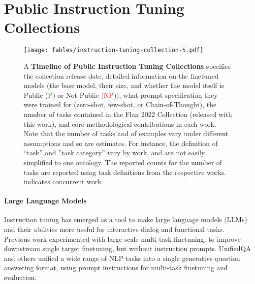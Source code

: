 \section{Public Instruction Tuning Collections}
\label{sec:public-collections}

\begin{figure}[h]
    \centering
    \texttt{[image: fables/instruction-tuning-collection-5.pdf]}
    \caption{
    \small
    A \textbf{Timeline of Public Instruction Tuning Collections} specifies the collection release date, detailed information on the finetuned models (the base model, their size, and whether the model itself is Public (\textcolor{forestgreen}{P}) or Not Public (\textcolor{red}{NP})), what prompt specification they were trained for (zero-shot, few-shot, or Chain-of-Thought), the number of tasks contained in the Flan 2022 Collection (released with this work), and core methodological contributions in each work.\\
    Note that the number of tasks and of examples vary under different assumptions and so are estimates. For instance, the definition of ``task'' and ''task category'' vary by work, and are not easily simplified to one ontology. The reported counts for the number of tasks are reported using task definitions from the respective works.\\
    \textsuperscript{\textdagger} indicates concurrent work.\\
    }
    \vspace{-3mm}
    \label{fig:instruction-tuning-collections}
\end{figure}

\paragraph{Large Language Models} Instruction tuning has emerged as a tool to make large language models (LLMs) and their abilities more useful for interactive dialog and functional tasks.
Previous work \citep{raffel2020exploring, liu2019multi,aghajanyan-etal-2021-muppet, aribandi2021ext5} experimented with large scale multi-task finetuning, to improve downstream single target finetuning, but without instruction prompts.
UnifiedQA and others \citep{khashabi-etal-2020-unifiedqa, mccann2018natural, keskar2019unifying} unified a wide range of NLP tasks into a single generative question answering format, using prompt instructions for multi-task finetuning and evaluation.

\vspace{-2mm}
